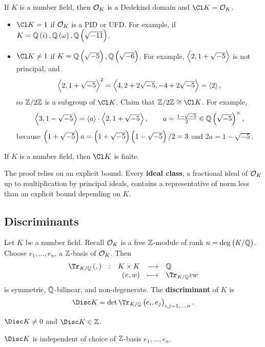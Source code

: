 If $ K $ is a number field, then $ \mathcal{O}_K $ is a Dedekind domain and $ \Cl K = \OOO_K $.

\begin{example*}
\hfill
\begin{itemize}
\item $ \Cl K = 1 $ if $ \mathcal{O}_K $ is a PID or UFD. For example, if $ K = \QQ\br{i}, \QQ\br{\omega}, \QQ\br{\sqrt{-11}} $.
\item $ \Cl K \ne 1 $ if $ K = \QQ\br{\sqrt{-5}}, \QQ\br{\sqrt{-6}} $. For example, $ \left\langle 2, 1 + \sqrt{-5} \right\rangle $ is not principal, and
$$ \left\langle 2, 1 + \sqrt{-5} \right\rangle^2 = \left\langle 4, 2 + 2\sqrt{-5}, -4 + 2\sqrt{-5} \right\rangle = \left\langle 2 \right\rangle, $$
so $ \mathbb{Z} / 2\mathbb{Z} $ is a subgroup of $ \Cl K $. Claim that $ \ZZ / 2\ZZ \cong \Cl K $. For example,
$$ \abr{3, 1 - \sqrt{-5}} = \abr{a} \cdot \abr{2, 1 + \sqrt{-5}}, \qquad a = \tfrac{1 - \sqrt{-5}}{2} \in \QQ\br{\sqrt{-5}}^\times, $$
because $ \br{1 + \sqrt{-5}}a = \br{1 + \sqrt{-5}}\br{1 - \sqrt{-5}} / 2 = 3 $ and $ 2a = 1 - \sqrt{-5} $.
\end{itemize}
\end{example*}

\begin{theorem}
If $ K $ is a number field, then $ \Cl K $ is finite.
\end{theorem}

The proof relies on an explicit bound. Every \textbf{ideal class}, a fractional ideal of $ \mathcal{O}_K $ up to multiplication by principal ideals, contains a representative of norm less than an explicit bound depending on $ K $.

\subsection{Discriminants}

Let $ K $ be a number field. Recall $ \mathcal{O}_K $ is a free $ \mathbb{Z} $-module of rank $ n = \deg \br{K / \QQ} $. Choose $ e_1, \dots, e_n $, a $ \mathbb{Z} $-basis of $ \mathcal{O}_K $. Then
$$ \function[\Tr_{K / \QQ}\br{,}]{K \times K}{\QQ}{\br{v, w}}{\Tr_{K / \QQ} vw} $$
is symmetric, $ \mathbb{Q} $-bilinear, and non-degenerate. The \textbf{discriminant} of $ K $ is
$$ \Disc K = \det \Tr_{K / \QQ}\br{e_i, e_j}_{i, j = 1, \dots, n}. $$

\begin{remark*}
$ \Disc K \ne 0 $ and $ \Disc K \in \ZZ $.
\end{remark*}

\pagebreak

\begin{lemma}
$ \Disc K $ is independent of choice of $ \mathbb{Z} $-basis $ e_1, \dots, e_n $.
\end{lemma}

